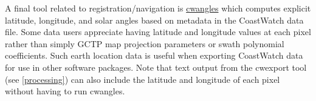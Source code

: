 A final tool related to registration/navigation is
\hyperlink{cwangles}{cwangles} which computes explicit latitude,
longitude, and solar angles based on metadata in the CoastWatch
data file.  Some data users appreciate having latitude and longitude
values at each pixel rather than simply GCTP map projection parameters
or swath polynomial coefficients.  Such earth location data is
useful when exporting CoastWatch data for use in other software
packages.  Note that text output from the cwexport tool (see
\autoref{processing}) can also include the latitude and longitude
of each pixel without having to run cwangles.


